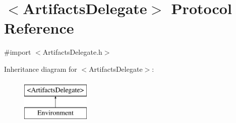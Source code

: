 \hypertarget{protocol_artifacts_delegate-p}{
\section{$<$\-Artifacts\-Delegate$>$ \-Protocol \-Reference}
\label{protocol_artifacts_delegate-p}
}


{\ttfamily \#import $<$\-Artifacts\-Delegate.\-h$>$}

\-Inheritance diagram for $<$\-Artifacts\-Delegate$>$\-:\begin{figure}[H]
\begin{center}
\leavevmode
\includegraphics[height=2.000000cm]{protocol_artifacts_delegate-p}
\end{center}
\end{figure}
